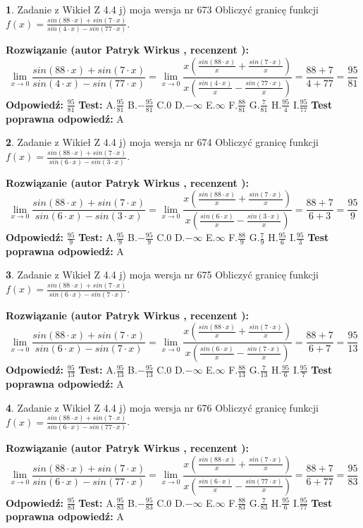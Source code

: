 \documentclass[12pt, a4paper]{article}
\theoremstyle{definition} %
\newtheorem{zad}{}
\newcommand{\zadStart}[1]{\begin{zad}#1\newline}
\newcommand{\zadStop}{\end{zad}}
\newcommand{\rozwStart}[2]{\noindent \textbf{Rozwiązanie (autor #1 , recenzent #2): }\newline}
\newcommand{\rozwStop}{\newline}
\newcommand{\odpStart}{\noindent \textbf{Odpowiedź:}\newline}
\newcommand{\odpStop}{\newline}
\newcommand{\testStart}{\noindent \textbf{Test:}\newline}
\newcommand{\testStop}{\newline}
\newcommand{\kluczStart}{\noindent \textbf{Test poprawna odpowiedź:}\newline}
\newcommand{\kluczStop}{\newline}
\begin{document}
\zadStart{Zadanie z Wikieł Z 4.4 j) moja wersja nr 673}
Obliczyć granicę funkcji $f(x)=\frac{sin(88\cdot x) +sin(7\cdot x)}{sin(4\cdot x) -sin(77\cdot x)}$.
\zadStop
\rozwStart{Patryk Wirkus}{}
$$\lim\limits_{x\to 0}\frac{sin(88\cdot x) +sin(7\cdot x)}{sin(4\cdot x) -sin(77\cdot x)}=\lim\limits_{x\to 0}\frac{x(\frac{sin(88\cdot x)}{x}+\frac{sin(7\cdot x)}{x})}{x(\frac{sin(4\cdot x)}{x}-\frac{sin(77\cdot x)}{x})}=\frac{88+7}{4+77} = \frac{95}{81}$$
\rozwStop
\odpStart
$\frac{95}{81}$
\odpStop
\testStart
A.$\frac{95}{81}$
B.$-\frac{95}{81}$
C.$0$
D.$-\infty$
E.$\infty$
F.$\frac{88}{81}$
G.$\frac{7}{81}$
H.$\frac{95}{4}$
I.$\frac{95}{77}$
\testStop
\kluczStart
A
\kluczStop



\zadStart{Zadanie z Wikieł Z 4.4 j) moja wersja nr 674}
Obliczyć granicę funkcji $f(x)=\frac{sin(88\cdot x) +sin(7\cdot x)}{sin(6\cdot x) -sin(3\cdot x)}$.
\zadStop
\rozwStart{Patryk Wirkus}{}
$$\lim\limits_{x\to 0}\frac{sin(88\cdot x) +sin(7\cdot x)}{sin(6\cdot x) -sin(3\cdot x)}=\lim\limits_{x\to 0}\frac{x(\frac{sin(88\cdot x)}{x}+\frac{sin(7\cdot x)}{x})}{x(\frac{sin(6\cdot x)}{x}-\frac{sin(3\cdot x)}{x})}=\frac{88+7}{6+3} = \frac{95}{9}$$
\rozwStop
\odpStart
$\frac{95}{9}$
\odpStop
\testStart
A.$\frac{95}{9}$
B.$-\frac{95}{9}$
C.$0$
D.$-\infty$
E.$\infty$
F.$\frac{88}{9}$
G.$\frac{7}{9}$
H.$\frac{95}{6}$
I.$\frac{95}{3}$
\testStop
\kluczStart
A
\kluczStop



\zadStart{Zadanie z Wikieł Z 4.4 j) moja wersja nr 675}
Obliczyć granicę funkcji $f(x)=\frac{sin(88\cdot x) +sin(7\cdot x)}{sin(6\cdot x) -sin(7\cdot x)}$.
\zadStop
\rozwStart{Patryk Wirkus}{}
$$\lim\limits_{x\to 0}\frac{sin(88\cdot x) +sin(7\cdot x)}{sin(6\cdot x) -sin(7\cdot x)}=\lim\limits_{x\to 0}\frac{x(\frac{sin(88\cdot x)}{x}+\frac{sin(7\cdot x)}{x})}{x(\frac{sin(6\cdot x)}{x}-\frac{sin(7\cdot x)}{x})}=\frac{88+7}{6+7} = \frac{95}{13}$$
\rozwStop
\odpStart
$\frac{95}{13}$
\odpStop
\testStart
A.$\frac{95}{13}$
B.$-\frac{95}{13}$
C.$0$
D.$-\infty$
E.$\infty$
F.$\frac{88}{13}$
G.$\frac{7}{13}$
H.$\frac{95}{6}$
I.$\frac{95}{7}$
\testStop
\kluczStart
A
\kluczStop



\zadStart{Zadanie z Wikieł Z 4.4 j) moja wersja nr 676}
Obliczyć granicę funkcji $f(x)=\frac{sin(88\cdot x) +sin(7\cdot x)}{sin(6\cdot x) -sin(77\cdot x)}$.
\zadStop
\rozwStart{Patryk Wirkus}{}
$$\lim\limits_{x\to 0}\frac{sin(88\cdot x) +sin(7\cdot x)}{sin(6\cdot x) -sin(77\cdot x)}=\lim\limits_{x\to 0}\frac{x(\frac{sin(88\cdot x)}{x}+\frac{sin(7\cdot x)}{x})}{x(\frac{sin(6\cdot x)}{x}-\frac{sin(77\cdot x)}{x})}=\frac{88+7}{6+77} = \frac{95}{83}$$
\rozwStop
\odpStart
$\frac{95}{83}$
\odpStop
\testStart
A.$\frac{95}{83}$
B.$-\frac{95}{83}$
C.$0$
D.$-\infty$
E.$\infty$
F.$\frac{88}{83}$
G.$\frac{7}{83}$
H.$\frac{95}{6}$
I.$\frac{95}{77}$
\testStop
\kluczStart
A
\kluczStop
\end{document}
